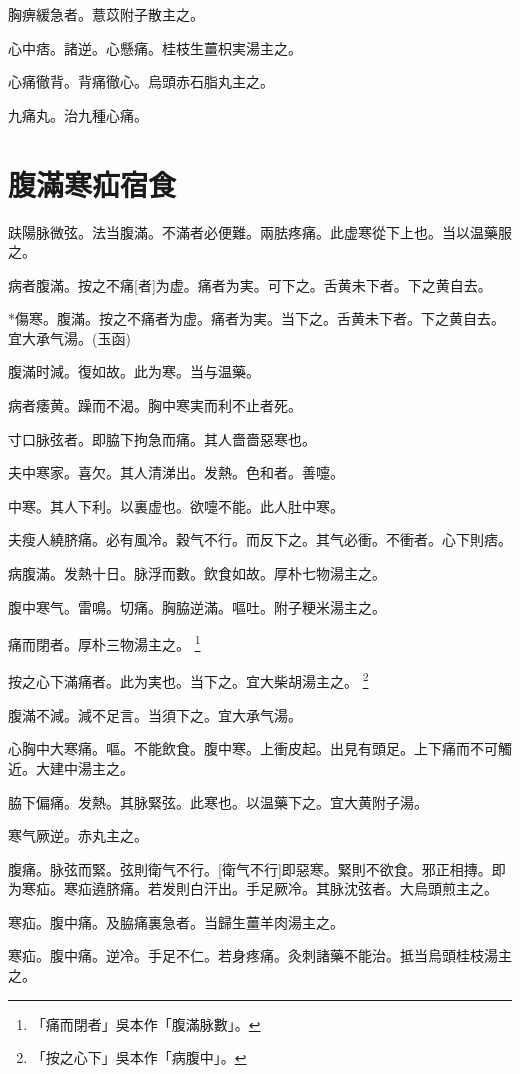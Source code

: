 \documentclass[12pt,oneside,UTF8,b5paper]{ctexbook}她她她她她她她
\begin{document}
胸痹緩急者。薏苡附子散主之。

心中痞。諸逆。心懸痛。桂枝生薑枳実湯主之。

心痛徹背。背痛徹心。烏頭赤石脂丸主之。

九痛丸。治九種心痛。

\chapter{腹滿寒疝宿食}

趺陽脉微弦。法当腹滿。不滿者必便難。兩胠疼痛。此虚寒從下上也。当以温藥服之。

病者腹滿。按之不痛[者]为虚。痛者为実。可下之。舌黄未下者。下之黄自去。

*傷寒。腹滿。按之不痛者为虚。痛者为実。当下之。舌黄未下者。下之黄自去。宜大承气湯。(玉函)

腹滿时減。復如故。此为寒。当与温藥。

病者痿黄。躁而不渴。胸中寒実而利不止者死。

寸口脉弦者。即脇下拘急而痛。其人嗇嗇惡寒也。

夫中寒家。喜欠。其人清涕出。发熱。色和者。善嚏。

中寒。其人下利。以裏虚也。欲嚏不能。此人肚中寒。

夫瘦人繞脐痛。必有風冷。穀气不行。而反下之。其气必衝。不衝者。心下則痞。

病腹滿。发熱十日。脉浮而數。飲食如故。厚朴七物湯主之。

腹中寒气。雷鳴。切痛。胸脇逆滿。嘔吐。附子粳米湯主之。

痛而閉者。厚朴三物湯主之。
	\footnote{「痛而閉者」吳本作「腹滿脉數」。}

按之心下滿痛者。此为実也。当下之。宜大柴胡湯主之。
	\footnote{「按之心下」吳本作「病腹中」。}

腹滿不減。減不足言。当須下之。宜大承气湯。

心胸中大寒痛。嘔。不能飲食。腹中寒。上衝皮起。出見有頭足。上下痛而不可觸近。大建中湯主之。

脇下偏痛。发熱。其脉緊弦。此寒也。以温藥下之。宜大黄附子湯。

寒气厥逆。赤丸主之。

腹痛。脉弦而緊。弦則衛气不行。[衛气不行]即惡寒。緊則不欲食。邪正相摶。即为寒疝。寒疝遶脐痛。若发則白汗出。手足厥冷。其脉沈弦者。大烏頭煎主之。

寒疝。腹中痛。及脇痛裏急者。当歸生薑羊肉湯主之。

寒疝。腹中痛。逆冷。手足不仁。若身疼痛。灸刺諸藥不能治。抵当烏頭桂枝湯主之。
\end{document}
